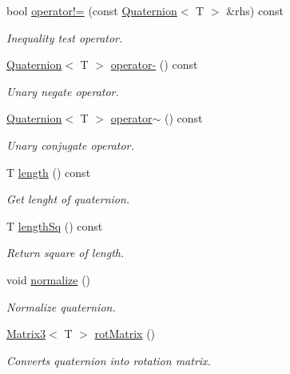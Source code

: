 \begin{DoxyCompactItemize}
bool \hyperlink{class_quaternion_a11892ce300a6e2d830314d795066ee1c}{operator!=} (const \hyperlink{class_quaternion}{Quaternion}$<$ T $>$ \&rhs) const 
\begin{DoxyCompactList}\small\item\em Inequality test operator. \item\end{DoxyCompactList}\item 
\hyperlink{class_quaternion}{Quaternion}$<$ T $>$ \hyperlink{class_quaternion_a2514c9e4a32f140cbac8bb7958d9b855}{operator-\/} () const 
\begin{DoxyCompactList}\small\item\em Unary negate operator. \item\end{DoxyCompactList}\item 
\hyperlink{class_quaternion}{Quaternion}$<$ T $>$ \hyperlink{class_quaternion_ab0393616ac07e35b9808f20bd1740fd5}{operator$\sim$} () const 
\begin{DoxyCompactList}\small\item\em Unary conjugate operator. \item\end{DoxyCompactList}\item 
T \hyperlink{class_quaternion_a47b0bf40eb963350af7c0585c840de0d}{length} () const 
\begin{DoxyCompactList}\small\item\em Get lenght of quaternion. \item\end{DoxyCompactList}\item 
T \hyperlink{class_quaternion_a4e9c538c1c9e2b28ee2399a26efdcbb6}{lengthSq} () const 
\begin{DoxyCompactList}\small\item\em Return square of length. \item\end{DoxyCompactList}\item 
void \hyperlink{class_quaternion_ac27752c31f3bb3620cb757fa3d07cd67}{normalize} ()
\begin{DoxyCompactList}\small\item\em Normalize quaternion. \item\end{DoxyCompactList}\item 
\hyperlink{class_matrix3}{Matrix3}$<$ T $>$ \hyperlink{class_quaternion_a1d74ff2d4fe84758f70b396de5b3f749}{rotMatrix} ()
\begin{DoxyCompactList}\small\item\em Converts quaternion into rotation matrix. \item\end{DoxyCompactList}\item 

\end{DoxyCompactItemize}
